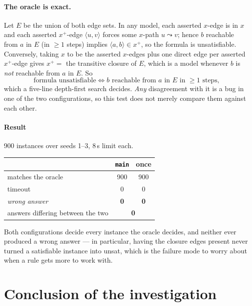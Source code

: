 \documentclass[11pt,a4paper]{article}
\newcommand{\code}[1]{\texttt{\small #1}}
\newcommand{\tup}[1]{\langle #1 \rangle}
\newcommand{\tc}[1]{{#1}^{+}}
\theoremstyle{definition}
\begin{document}
\paragraph{The oracle is exact.} Let $E$ be the union of both edge sets. In any
model, each asserted $x$-edge is in $x$ and each asserted $\tc{x}$-edge
$\tup{u,v}$ forces some $x$-path $u\leadsto v$; hence $b$ reachable from $a$ in
$E$ (in $\ge 1$ steps) implies $\tup{a,b}\in\tc{x}$, so the formula is
unsatisfiable. Conversely, taking $x$ to be the asserted $x$-edges plus one
direct edge per asserted $\tc{x}$-edge gives $\tc{x} = $ the transitive closure
of $E$, which is a model whenever $b$ is \emph{not} reachable from $a$ in $E$.
So
\[
  \text{formula unsatisfiable} \iff b \text{ reachable from } a \text{ in } E
  \text{ in } \ge 1 \text{ steps},
\]
which a five-line depth-first search decides. \emph{Any} disagreement with it is
a bug in one of the two configurations, so this test does not merely compare
them against each other.

\paragraph{Result} 900 instances over seeds 1--3, 8\,s limit each.

\begin{center}\small
\renewcommand{\arraystretch}{1.2}
\begin{tabular}{@{}lcc@{}}
\toprule
& \code{main} & once\\
\midrule
matches the oracle & 900 & 900\\
timeout            & 0   & 0\\
\emph{wrong answer}& \textbf{0} & \textbf{0}\\
answers differing between the two & \multicolumn{2}{c}{\textbf{0}}\\
\bottomrule
\end{tabular}
\end{center}

\noindent
Both configurations decide every instance the oracle decides, and neither ever
produced a wrong answer --- in particular, having the closure edges present never
turned a satisfiable instance into \textsf{unsat}, which is the failure mode to
worry about when a rule gets more to work with.

\section{Conclusion of the investigation}
\end{document}
